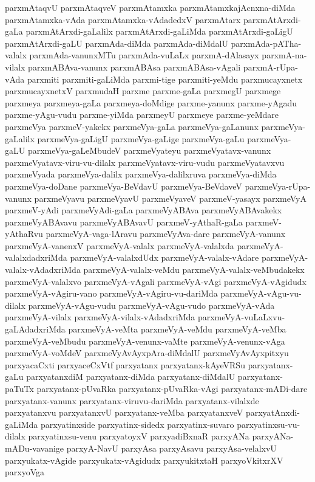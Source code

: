 {parxmAtaqvU
parxmAtaqveV
parxmAtamxka
parxmAtamxkajAcnxna-diMda
parxmAtamxka-vAda
parxmAtamxka-vAdadedxV
parxmAtarx
parxmAtArxdi-gaLa
parxmAtArxdi-gaLalilx
parxmAtArxdi-gaLiMda
parxmAtArxdi-gaLigU
parxmAtArxdi-gaLU
parxmAda-diMda
parxmAda-diMdalU
parxmAda-pATha-valalx
parxmAda-vanunxMTu
parxmAda-vuLaLx
parxmA-dAlasayx
parxmA-na-vilalx
parxmABAva-vanunx
parxmABAsa
parxmABAsa-vAgali
parxmA-rUpa-vAda
parxmiti
parxmiti-gaLiMda
parxmi-tige
parxmiti-yeMdu
parxmucayxnetx
parxmucayxnetxV
parxmudaH
parxme
parxme-gaLa
parxmegU
parxmege
parxmeya
parxmeya-gaLa
parxmeya-doMdige
parxme-yanunx
parxme-yAgadu
parxme-yAgu-vudu
parxme-yiMda
parxmeyU
parxmeye
parxme-yeMdare
parxmeVya
parxmeV-yakekx
parxmeVya-gaLa
parxmeVya-gaLanunx
parxmeVya-gaLalilx
parxmeVya-gaLigU
parxmeVya-gaLige
parxmeVya-gaLu
parxmeVya-gaLU
parxmeVya-gaLeMbudeV
parxmeVyateyu
parxmeVyatavx-vanunx
parxmeVyatavx-viru-vu-dilalx
parxmeVyatavx-viru-vudu
parxmeVyatavxvu
parxmeVyada
parxmeVya-dalilx
parxmeVya-dalilxruva
parxmeVya-diMda
parxmeVya-doDane
parxmeVya-BeVdavU
parxmeVya-BeVdaveV
parxmeVya-rUpa-vanunx
parxmeVyavu
parxmeVyavU
parxmeVyaveV
parxmeV-yasayx
parxmeVyA
parxmeV-yAdi
parxmeVyAdi-gaLa
parxmeVyABAva
parxmeVyABAvakekx
parxmeVyABAvavu
parxmeVyABAvavU
parxmeV-yAthaR-gaLa
parxmeV-yAthaRvu
parxmeVyA-vaga-lAravu
parxmeVyAva-dare
parxmeVyA-vanunx
parxmeVyA-vanenxV
parxmeVyA-valalx
parxmeVyA-valalxda
parxmeVyA-valalxdadxriMda
parxmeVyA-valalxdUdx
parxmeVyA-valalx-vAdare
parxmeVyA-valalx-vAdadxriMda
parxmeVyA-valalx-veMdu
parxmeVyA-valalx-veMbudakekx
parxmeVyA-valalxvo
parxmeVyA-vAgali
parxmeVyA-vAgi
parxmeVyA-vAgidudx
parxmeVyA-vAgiru-vano
parxmeVyA-vAgiru-vu-dariMda
parxmeVyA-vAgu-vu-dilalx
parxmeVyA-vAgu-vudu
parxmeVyA-vAgu-vudo
parxmeVyA-vAda
parxmeVyA-vilalx
parxmeVyA-vilalx-vAdadxriMda
parxmeVyA-vuLaLxvu-gaLAdadxriMda
parxmeVyA-veMta
parxmeVyA-veMdu
parxmeVyA-veMba
parxmeVyA-veMbudu
parxmeVyA-venunx-vaMte
parxmeVyA-venunx-vAga
parxmeVyA-voMdeV
parxmeVyAvAyxpAra-diMdalU
parxmeVyAvAyxpitxyu
parxyacaCxti
parxyaceCxVtf
parxyatanx
parxyatanx-kAyeVRSu
parxyatanx-gaLu
parxyatanxdiM
parxyatanx-diMda
parxyatanx-diMdalU
parxyatanx-paTuTx
parxyatanx-pUvaRka
parxyatanx-pUvaRka-vAgi
parxyatanx-mADi-dare
parxyatanx-vanunx
parxyatanx-viruvu-dariMda
parxyatanx-vilalxde
parxyatanxvu
parxyatanxvU
parxyatanx-veMba
parxyatanxveV
parxyatAnxdi-gaLiMda
parxyatinxside
parxyatinx-sidedx
parxyatinx-suvaro
parxyatinxsu-vu-dilalx
parxyatinxsu-venu
parxyatoyxV
parxyadiBxnaR
parxyANa
parxyANa-mADu-vavanige
parxyA-NavU
parxyAsa
parxyAsavu
parxyAsa-velalxvU
parxyukatx-vAgide
parxyukatx-vAgidudx
parxyukitxtaH
parxyoVkitxrXV
parxyoVga
}
